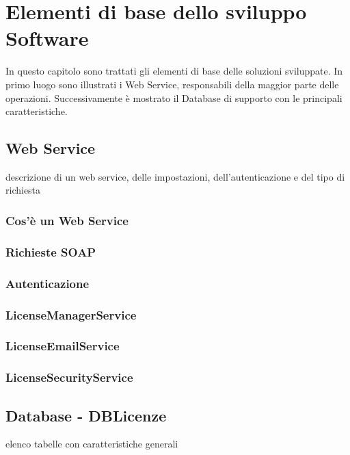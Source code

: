 
\chapter{Elementi di base dello sviluppo Software}
\label{cap:sviluppo-software}

In questo capitolo sono trattati gli elementi di base delle soluzioni sviluppate. In primo luogo sono illustrati i Web Service, responsabili della maggior parte delle operazioni. Successivamente è mostrato il Database di supporto con le principali caratteristiche.


\section{Web Service}

descrizione di un web service, delle impostazioni, dell'autenticazione e del tipo di richiesta
\subsection{Cos'è un Web Service}

\subsection{Richieste SOAP}

\subsection{Autenticazione}

\subsection{LicenseManagerService}

\subsection{LicenseEmailService}

\subsection{LicenseSecurityService}


\section{Database - DBLicenze}
\label{sez:DBLic}
elenco tabelle con caratteristiche generali
